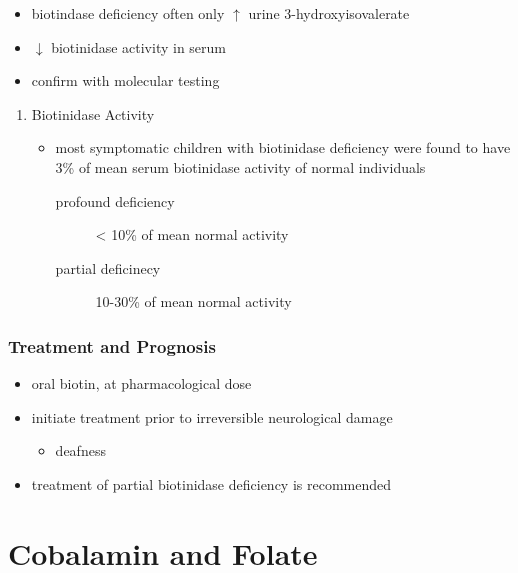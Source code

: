 \documentclass{scrartcl}
\begin{document}
\begin{itemize}
\item biotindase deficiency often only \(\uparrow\) urine 3-hydroxyisovalerate
\item \(\downarrow\) biotinidase activity in serum
\item confirm with molecular testing
\end{itemize}

\begin{enumerate}
\item Biotinidase Activity
\label{sec:org9661e47}
\begin{itemize}
\item most symptomatic children with biotinidase deficiency were found to
have 3\% of mean serum biotinidase activity of normal individuals
\begin{description}
\item[{profound deficiency}] \textless{} 10\% of mean normal activity
\item[{partial deficinecy}] 10-30\% of mean normal activity
\end{description}
\end{itemize}
\end{enumerate}

\subsubsection{Treatment and Prognosis}
\label{sec:orgbc1ce5a}
\begin{itemize}
\item oral biotin, at pharmacological dose
\item initiate treatment prior to irreversible neurological damage
\begin{itemize}
\item deafness
\end{itemize}
\item treatment of partial biotinidase deficiency is recommended
\end{itemize}

\section{Cobalamin and Folate}
\label{sec:orga80236c}
\end{document}
